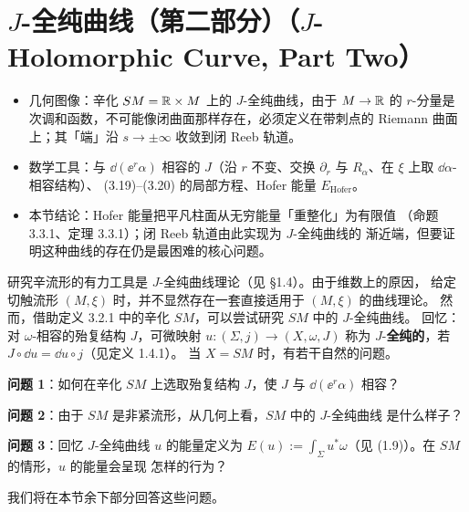 \section{$J$-全纯曲线（第二部分）（$J$-Holomorphic Curve, Part Two）}

\begin{keytakeaways}
\begin{itemize}
  \item 几何图像：辛化 $SM=\mathbb{R}\times M$ 上的 $J$-全纯曲线，由于 $M\to\mathbb{R}$ 的
        $r$-分量是次调和函数，不可能像闭曲面那样存在，必须定义在带刺点的
        Riemann 曲面上；其「端」沿 $s\to\pm\infty$ 收敛到闭 Reeb 轨道。
  \item 数学工具：与 $\dd(\ee^r\alpha)$ 相容的 $J$（沿 $r$ 不变、交换
        $\partial_r$ 与 $R_\alpha$、在 $\xi$ 上取 $\dd\alpha$-相容结构）、
        (3.19)–(3.20) 的局部方程、Hofer 能量 $E_{\mathrm{Hofer}}$。
  \item 本节结论：Hofer 能量把平凡柱面从无穷能量「重整化」为有限值
        （命题 3.3.1、定理 3.3.1）；闭 Reeb 轨道由此实现为 $J$-全纯曲线的
        渐近端，但要证明这种曲线的存在仍是最困难的核心问题。
\end{itemize}
\end{keytakeaways}

研究辛流形的有力工具是 $J$-全纯曲线理论（见 §1.4）。由于维数上的原因，
给定切触流形 $(M,\xi)$ 时，并不显然存在一套直接适用于 $(M,\xi)$ 的曲线理论。
然而，借助定义 3.2.1 中的辛化 $SM$，可以尝试研究 $SM$ 中的 $J$-全纯曲线。
回忆：对 $\omega$-相容的殆复结构 $J$，可微映射 $u:(\Sigma,j)\to(X,\omega,J)$
称为 $J$-\textbf{全纯的}，若 $J\circ\dd u=\dd u\circ j$（见定义 1.4.1）。
当 $X=SM$ 时，有若干自然的问题。

\textbf{问题 1}：如何在辛化 $SM$ 上选取殆复结构 $J$，使 $J$ 与
$\dd(\ee^r\alpha)$ 相容？

\textbf{问题 2}：由于 $SM$ 是非紧流形，从几何上看，$SM$ 中的 $J$-全纯曲线
是什么样子？

\textbf{问题 3}：回忆 $J$-全纯曲线 $u$ 的能量定义为
$E(u):=\int_\Sigma u^*\omega$（见 (1.9)）。在 $SM$ 的情形，$u$ 的能量会呈现
怎样的行为？

我们将在本节余下部分回答这些问题。

